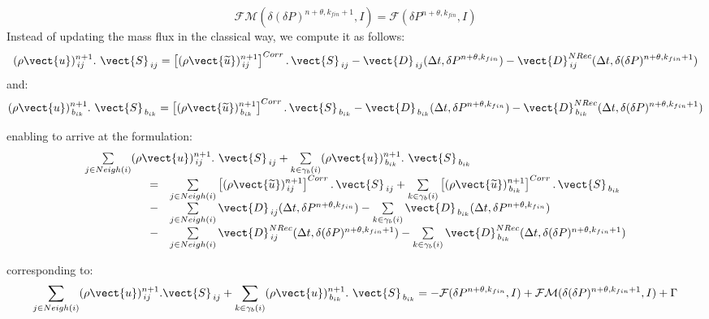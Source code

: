 \begin{equation}\label{resol_pression_derniere_it}
\mathcal{FM}(\delta(\delta P)^{n+\theta,k_{fin}+1},I) = \mathcal{F}(\delta P^{n+\theta,k_{fin}},I)
\end{equation}
Instead of updating the mass flux in the classical way, we compute it as
follows:
\begin{equation}\notag
(\rho \vect{u})^{n+1}_{\,ij}\text{.}\ \vect{S}_{\,ij} =
\left[(\rho \vect{\widetilde{u}})^{n+1}_{\,ij}\right]^{Corr}\text{.}\,\vect{S}_{\,ij}
-\vect{D}_{\,ij}(\Delta t,\delta P^{n+\theta,k_{fin}})
-\vect{D}^{NRec}_{\,ij}(\Delta t,\delta (\delta P)^{n+\theta,k_{fin}+1})
\end{equation}
and:
\begin{equation}\notag
(\rho \vect{u})^{n+1}_{\,b_{ik}}\text{.}\ \vect{S}_{\,b_{ik}} =
\left[(\rho \vect{\widetilde{u}})^{n+1}_{\,b_{ik}}\right]^{Corr}\text{.}\,\vect{S}_{\,b_{ik}}
-\vect{D}_{\,b_{ik}}(\Delta t,\delta P^{n+\theta,k_{fin}})
-\vect{D}^{NRec}_{\,b_{ik}}(\Delta t,\delta (\delta P)^{n+\theta,k_{fin}+1})
\end{equation}

enabling to arrive at the formulation:
\begin{equation}\notag
\begin{array}{ll}
\multicolumn{2}{l}{\sum\limits_{j\in Neigh(i)}(\rho
\vect{u})^{n+1}_{\,ij}\text{.}\ \vect{S}_{\,ij}
+\sum\limits_{k\in {\gamma_b(i)}}(\rho\vect{u})^{n+1}_{\,b_{ik}}.\
\vect{S}_{\,b_{ik}}}\\
\hspace*{2cm}=&
\sum\limits_{j\in Neigh(i)}{\left[(\rho \vect{\widetilde{u}})^{n+1}_{\,ij}\right]^{Corr}.\,
\vect{S}_{\,ij}}
+ \sum\limits_{k\in {\gamma_b(i)}}\left[(\rho\vect{\widetilde{u}})^{n+1}_{\,b_{ik}}\right]^{Corr}\text{.}\,\vect{S}_{\,b_{ik}} \\
\hspace*{2cm}-&\sum\limits_{j\in Neigh(i)}
\vect{D}_{\,ij}(\Delta t,\delta P^{n+\theta,k_{fin}})
-\sum\limits_{k\in {\gamma_b(i)}}\vect{D}_{\,b_{ik}}(\Delta t,\delta
P^{n+\theta,k_{fin}})\\
\hspace*{2cm}-&{\sum\limits_{j\in Neigh(i)}\vect{D}^{NRec}_{\,ij}(\Delta t,\delta (\delta
P)^{n+\theta,k_{fin}+1})}
-\sum\limits_{k\in {\gamma_b(i)}}\vect{D}^{NRec}_{\,b_{ik}}(\Delta t,\delta
(\delta P)^{n+\theta,k_{fin}+1})
\end{array}
\end{equation}


corresponding to:
\begin{equation}\notag
\sum\limits_{j\in Neigh(i)}(\rho \vect{u})^{n+1}_{\,ij}\text{.}\vect{S}_{\,ij}
+\sum\limits_{k\in {\gamma_b(i)}}(\rho\vect{u})^{n+1}_{\,b_{ik}}.\
\vect{S}_{\,b_{ik}}= -\mathcal{F}(\delta
P^{n+\theta,k_{fin}},I)+\mathcal{FM}(\delta(\delta P)^{n+\theta,k_{fin}+1},I) + \Gamma
\end{equation}

